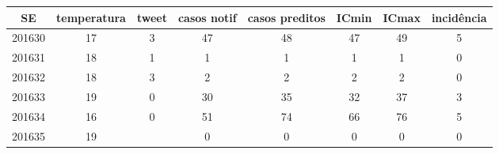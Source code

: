 \begin{tabular}{c|ccccccc}
  \hline
SE & temperatura & tweet & casos notif & casos preditos & ICmin & ICmax & incidência \\ 
  \hline
201630 & 17 & 3 & 47 & 48 & 47 & 49 & 5 \\ 
  201631 & 18 & 1 & 1 & 1 & 1 & 1 & 0 \\ 
  201632 & 18 & 3 & 2 & 2 & 2 & 2 & 0 \\ 
  201633 & 19 & 0 & 30 & 35 & 32 & 37 & 3 \\ 
  201634 & 16 & 0 & 51 & 74 & 66 & 76 & 5 \\ 
  201635 & 19 &  & 0 & 0 & 0 & 0 & 0 \\ 
   \hline
\end{tabular}
